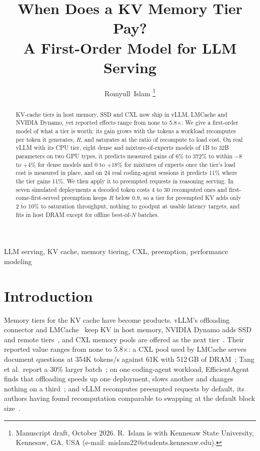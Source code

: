 \documentclass[journal]{IEEEtran}
\begin{document}

\title{When Does a KV Memory Tier Pay?\\A First-Order Model for LLM Serving}

\author{Romyull~Islam
\thanks{Manuscript draft, October 2026. R.~Islam is with Kennesaw State University, Kennesaw, GA,
USA (e-mail: mislam22@students.kennesaw.edu).}}%
\maketitle

\begin{abstract}
KV-cache tiers in host memory, SSD and CXL now ship in vLLM, LMCache and NVIDIA Dynamo, yet
reported effects range from none to 5.8$\times$. We give a first-order model of what a tier is
worth: its gain grows with the tokens a workload recomputes per token it generates, $R$, and
saturates at the ratio of recompute to load cost. On real vLLM with its CPU tier, eight dense and
mixture-of-experts models of 1B to 32B parameters on two GPU types, it predicts measured gains of 6\%
to 372\% to within $-8$ to $+4\%$ for dense models and 0 to $+18\%$ for mixtures of experts once
the tier's load cost is measured in place, and on 24 real coding-agent sessions it predicts 11\%
where the tier gains 11\%. We then apply it to preempted requests in
reasoning serving. In seven simulated deployments a decoded token
costs 4 to 30 recomputed ones and first-come-first-served preemption keeps $R$ below 0.9, so a tier
for preempted KV adds only 2 to 10\% to saturation throughput, nothing to goodput at usable latency
targets, and fits in host DRAM except for offline best-of-$N$ batches.
\end{abstract}

\begin{IEEEkeywords}
LLM serving, KV cache, memory tiering, CXL, preemption, performance modeling
\end{IEEEkeywords}

\section{Introduction}
Memory tiers for the KV cache have become products. vLLM's offloading connector and
LMCache~\cite{lmcache} keep KV in host memory, NVIDIA Dynamo adds SSD and remote
tiers~\cite{dynamo_kvbm}, and CXL memory pools are offered as the next
tier~\cite{samsung_cmmd,huen_cal,tang_cxl}. Their reported value ranges from none to 5.8$\times$: a CXL pool
used by LMCache serves document questions at 354K tokens/s against 61K with 512\,GB of
DRAM~\cite{samsung_cmmd}; Tang et al.\ report a 30\% larger batch~\cite{tang_cxl}; on one coding-agent workload, EfficientAgent finds that offloading speeds up one deployment, slows
another and changes nothing on a third~\cite{efficientagent}; and
vLLM recomputes preempted requests by default, its authors having found recomputation comparable to
swapping at the default block size~\cite{vllm}.
\end{document}
